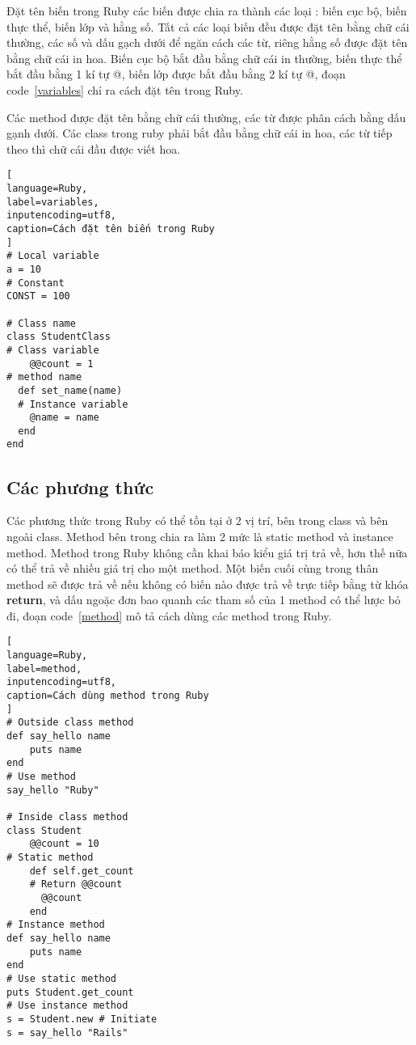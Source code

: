 Đặt tên biến trong Ruby các biến được chia ra thành các loại : biến cục bộ, biến thực thể, biến lớp và hằng số. Tất cả các loại biến đều được đặt tên bằng chữ cái thường, các số và dấu gạch dưới để ngăn cách các từ, riêng hằng số được đặt tên bằng chữ cái in hoa. Biến cục bộ bắt đầu bằng chữ cái in thường, biến thực thể bắt đầu bằng 1 kí tự @, biến lớp được bắt đầu bằng 2 kí tự @, đoạn code~\ref{variables} chỉ ra cách đặt tên trong Ruby.\newline

Các method được đặt tên bằng chữ cái thường, các từ được phân cách bằng dấu gạnh dưới. Các class trong ruby phải bắt đầu bằng chữ cái in hoa, các từ tiếp theo thì chữ cái đầu được viết hoa.

\begin{lstlisting}[
language=Ruby,
label=variables,
inputencoding=utf8,
caption=Cách đặt tên biến trong Ruby
]
# Local variable
a = 10
# Constant
CONST = 100

# Class name
class StudentClass
# Class variable
    @@count = 1
# method name
  def set_name(name)
  # Instance variable
    @name = name
  end
end
\end{lstlisting}

\subsection{Các phương thức}
Các phương thức trong Ruby có thể tồn tại ở 2 vị trí, bên trong class và bên ngoài class. Method bên trong chia ra làm 2 mức là static method và instance method. Method trong Ruby không cần khai báo kiểu giá trị trả về, hơn thế nữa có thể trả về nhiều giá trị cho một method. Một biến cuối cùng trong thân method sẽ được trả về nếu không có biến nào được trả về trực tiếp bằng từ khóa {\bf return}, và dấu ngoặc đơn bao quanh các tham số của 1 method có thể lược bỏ đi, đoạn code~\ref{method} mô tả cách dùng các method trong Ruby.
\begin{lstlisting}[
language=Ruby,
label=method,
inputencoding=utf8,
caption=Cách dùng method trong Ruby
]
# Outside class method
def say_hello name
    puts name
end
# Use method 
say_hello "Ruby"

# Inside class method
class Student
    @@count = 10
# Static method
    def self.get_count
    # Return @@count
      @@count
    end
# Instance method
def say_hello name
    puts name
end
# Use static method
puts Student.get_count
# Use instance method
s = Student.new # Initiate 
s = say_hello "Rails"
\end{lstlisting}

